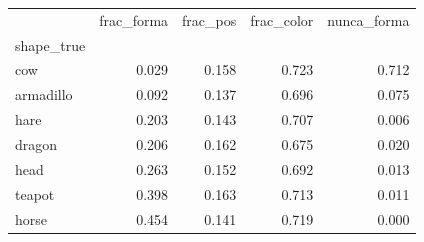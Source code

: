 \begin{tabular}{lrrrr}
\toprule
 & frac\_forma & frac\_pos & frac\_color & nunca\_forma \\
shape\_true &  &  &  &  \\
\midrule
cow & 0.029 & 0.158 & 0.723 & 0.712 \\
armadillo & 0.092 & 0.137 & 0.696 & 0.075 \\
hare & 0.203 & 0.143 & 0.707 & 0.006 \\
dragon & 0.206 & 0.162 & 0.675 & 0.020 \\
head & 0.263 & 0.152 & 0.692 & 0.013 \\
teapot & 0.398 & 0.163 & 0.713 & 0.011 \\
horse & 0.454 & 0.141 & 0.719 & 0.000 \\
\bottomrule
\end{tabular}
